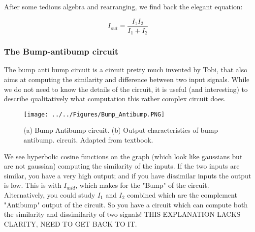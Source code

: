 After some tedious algebra and rearranging, we find back the elegant equation: 

\begin{equation}
    I_{out} = \frac{I_1 I_2}{I_1 + I_2}
\end{equation} 

\subsubsection{The Bump-antibump circuit}
\label{section:bumbantibumb}
The bump anti bump circuit is a circuit pretty much invented by Tobi, that also aims at computing the similarity and difference between two input signals. While we do not need to know the details of the circuit, it is useful (and interesting) to describe qualitatively what computation this rather complex circuit does. 

\begin{figure}[H]
    \centering
    \texttt{[image: ../../Figures/Bump\_Antibump.PNG]}
    \caption{(a) Bump-Antibump circuit. (b)  Output characteristics of bump-antibump.  circuit. Adapted from textbook.}
    \label{fig:basalandcerebellum}
\end{figure}

We see hyperbolic cosine functions on the graph (which look like gaussians but are not gaussian) computing the similarity of the inputs. If the two inputs are similar, you have a very high output; and if you have dissimilar inputs the output is low. This is with $I_{mid}$, which makes for the "Bump" of the circuit. Alternatively, you could study $I_1$ and $I_2$ combined which are the complement "Antibump" output of the circuit. So you have a circuit which can compute both the similarity and dissimilarity of two signals! THIS EXPLANATION LACKS CLARITY, NEED TO GET BACK TO IT.